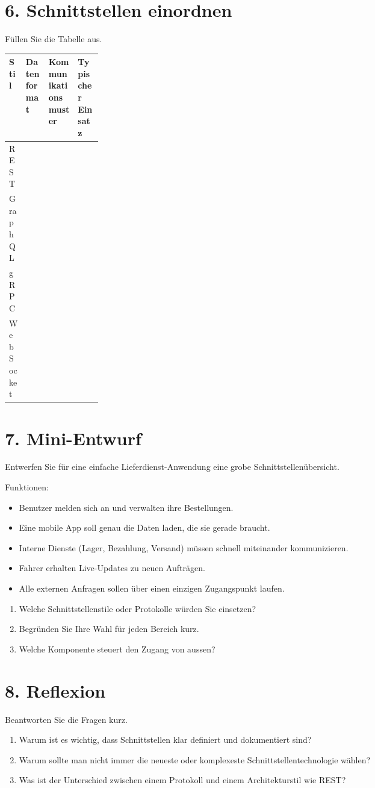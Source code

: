\documentclass[11pt,a4paper]{article}
\begin{document}
\section*{6. Schnittstellen einordnen}
Füllen Sie die Tabelle aus.

\begin{tabularx}{\linewidth}{|>{\raggedright\arraybackslash}p{0.18\linewidth}|>{\raggedright\arraybackslash}X|>{\raggedright\arraybackslash}X|>{\raggedright\arraybackslash}X|}
\hline
\textbf{Stil} & \textbf{Datenformat} & \textbf{Kommunikations\-muster} & \textbf{Typischer Einsatz} \\
\hline
REST & & & \\[0.9cm] \hline
GraphQL & & & \\[0.9cm] \hline
gRPC & & & \\[0.9cm] \hline
WebSocket & & & \\[0.9cm] \hline
\end{tabularx}

\section*{7. Mini-Entwurf}
Entwerfen Sie für eine einfache Lieferdienst-Anwendung eine grobe Schnittstellenübersicht.

Funktionen:
\begin{itemize}
  \item Benutzer melden sich an und verwalten ihre Bestellungen.
  \item Eine mobile App soll genau die Daten laden, die sie gerade braucht.
  \item Interne Dienste (Lager, Bezahlung, Versand) müssen schnell miteinander kommunizieren.
  \item Fahrer erhalten Live-Updates zu neuen Aufträgen.
  \item Alle externen Anfragen sollen über einen einzigen Zugangspunkt laufen.
\end{itemize}

\begin{enumerate}
  \item Welche Schnittstellenstile oder Protokolle würden Sie einsetzen?
  \item Begründen Sie Ihre Wahl für jeden Bereich kurz.
  \item Welche Komponente steuert den Zugang von aussen?
\end{enumerate}

\section*{8. Reflexion}
Beantworten Sie die Fragen kurz.

\begin{enumerate}
  \item Warum ist es wichtig, dass Schnittstellen klar definiert und dokumentiert sind?
  \item Warum sollte man nicht immer die neueste oder komplexeste Schnittstellentechnologie wählen?
  \item Was ist der Unterschied zwischen einem Protokoll und einem Architekturstil wie REST?
\end{enumerate}
\end{document}
